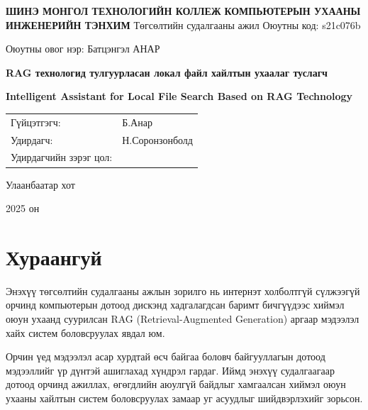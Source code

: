 \documentclass[11pt,a4paper]{article}
\begin{document}
\begin{titlepage}
    \thispagestyle{empty}
    \centering
    \vspace*{1cm}
    {\Large \textbf{ШИНЭ МОНГОЛ ТЕХНОЛОГИЙН КОЛЛЕЖ}}
    \vspace{0.5cm}
    {\large \textbf{КОМПЬЮТЕРЫН УХААНЫ ИНЖЕНЕРИЙН ТЭНХИМ}}
    \vspace{2cm}
      {\large Төгсөлтийн судалгааны ажил}
      \vspace{0.8cm}
      {\large Оюутны код: s21c076b}

      {\large Оюутны овог нэр: Батцэнгэл АНАР}
      \vspace{1cm}
      {\fontsize{14pt}{16pt}\selectfont\textbf{RAG технологид тулгуурласан локал файл хайлтын ухаалаг туслагч}\par}
      \vspace{0.25cm}
      {\fontsize{11pt}{13pt}\selectfont\textbf{Intelligent Assistant for Local File Search Based on RAG Technology}\par}
    \vfill
    \begin{tabular}{ll}
            Гүйцэтгэгч: & Б.Анар \\
            Удирдагч:   & Н.Соронзонболд \\
            Удирдагчийн зэрэг цол: & \underline{\hspace{4.5cm}}
    \end{tabular}
    \vspace{1cm}
    {\large Улаанбаатар хот}

    {\large 2025 он}
\end{titlepage}


\newpage
\section*{Хураангуй}

Энэхүү төгсөлтийн судалгааны ажлын зорилго нь интернэт холболтгүй сүлжээгүй орчинд компьютерын дотоод дискэнд хадгалагдсан баримт бичгүүдээс хиймэл оюун ухаанд суурилсан RAG (Retrieval-Augmented Generation) аргаар мэдээлэл хайх систем боловсруулах явдал юм.

Орчин үед мэдээлэл асар хурдтай өсч байгаа боловч байгууллагын дотоод мэдээллийг үр дүнтэй ашиглахад хүндрэл гардаг. Иймд энэхүү судалгаагаар дотоод орчинд ажиллах, өгөгдлийн аюулгүй байдлыг хамгаалсан хиймэл оюун ухааны хайлтын систем боловсруулах замаар уг асуудлыг шийдвэрлэхийг зорьсон.
\end{document}
